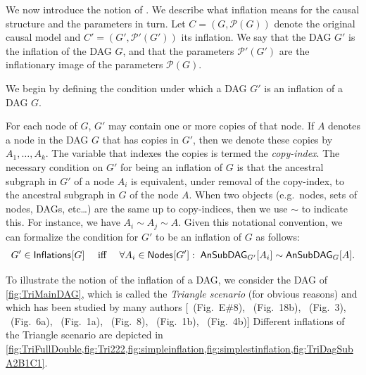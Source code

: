 We now introduce the notion of .  We describe what inflation means for the causal structure and the parameters in turn. 
 Let $C=(G,\mathcal{P}(G))$ denote the original causal model and $C'=(G',\mathcal{P'}(G'))$ its inflation.  We say that the DAG $G'$ is the inflation of the DAG $G$, and that the parameters $\mathcal{P'}(G')$ are the inflationary image of the parameters $\mathcal{P}(G)$.

We begin by defining the condition under which a DAG $G'$  is an inflation of a DAG $G$.

For each node of $G$, $G'$ may contain one or more copies of that node. If $A$ denotes a node in the DAG $G$ that has copies in $G'$, then we denote these copies by $A_1,\ldots, A_k$.  The variable that indexes the copies is termed the {\em copy-index}.
The necessary condition on $G'$ for being an inflation of $G$ is that the ancestral subgraph in $G'$ of a node $A_i$ is equivalent, under removal of the copy-index, to the ancestral subgraph in $G$ of the node $A$.  
When two objects (e.g.~nodes, sets of nodes, DAGs, etc\ldots) are the same up to copy-indices, then we use $\sim$ to indicate this.  For instance, we have $A_i\sim A_j\sim A$.  Given this notational convention, we can formalize the condition for $G'$ to be an inflation of $G$ as follows:
\begin{align}\label{eq:definflationDAG}
G' \in\SmallNamedFunction{Inflations}{G} \quad\text{ iff }\quad \forall A_i\in \SmallNamedFunction{Nodes}{G'}:\; \ansubgraph[G']{A_i}\sim\ansubgraph[G]{A}.
\end{align}

To illustrate the notion of the inflation of a DAG, we consider the DAG of \cref{fig:TriMainDAG}, which is called the {\em Triangle scenario} (for obvious reasons) and which has been studied by many authors [\citealp{pusey2014gdag}~(Fig.~E\#8), \citealp{WoodSpekkens}~(Fig.~18b), \citealp{fritz2012bell}~(Fig.~3), \citealp{chaves2014novel}~(Fig.~6a), \citealp{Chaves2015infoquantum}~(Fig.~1a), \citealp{BilocalCorrelations}~(Fig.~8), \citealp{steudel2010ancestors}~(Fig.~1b), \citealp{chaves2014informationinference}~(Fig.~4b)]
Different inflations of the Triangle scenario are depicted in \cref{fig:TriFullDouble,fig:Tri222,fig:simpleinflation,fig:simplestinflation,fig:TriDagSubA2B1C1}.


